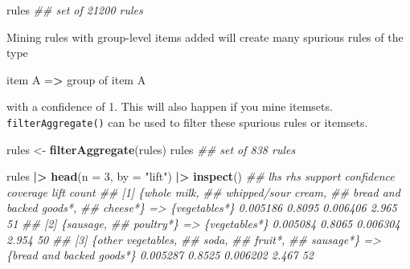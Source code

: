 \documentclass[
  notitlepage]{book}
\newenvironment{Shaded}{\begin{snugshade}}{\end{snugshade}}
\newcommand{\CommentTok}[1]{\textcolor[rgb]{0.56,0.35,0.01}{\textit{#1}}}
\newcommand{\DataTypeTok}[1]{\textcolor[rgb]{0.13,0.29,0.53}{#1}}
\newcommand{\DecValTok}[1]{\textcolor[rgb]{0.00,0.00,0.81}{#1}}
\newcommand{\ErrorTok}[1]{\textcolor[rgb]{0.64,0.00,0.00}{\textbf{#1}}}
\newcommand{\KeywordTok}[1]{\textcolor[rgb]{0.13,0.29,0.53}{\textbf{#1}}}
\newcommand{\NormalTok}[1]{#1}
\newcommand{\OperatorTok}[1]{\textcolor[rgb]{0.81,0.36,0.00}{\textbf{#1}}}
\newcommand{\StringTok}[1]{\textcolor[rgb]{0.31,0.60,0.02}{#1}}
\begin{document}
\begin{Shaded}
\begin{Highlighting}[]
\NormalTok{rules}
\CommentTok{\#\# set of 21200 rules}
\end{Highlighting}
\end{Shaded}

Mining rules with group-level items added will
create many spurious rules of the type

\begin{Shaded}
\begin{Highlighting}[]
\NormalTok{⁠item A =}\ErrorTok{\textgreater{}}\StringTok{ }\NormalTok{group of item A⁠}
\end{Highlighting}
\end{Shaded}

with a confidence of 1.
This will also happen if you mine itemsets. \texttt{filterAggregate()}
can be used to filter these spurious rules or itemsets.

\begin{Shaded}
\begin{Highlighting}[]
\NormalTok{rules \textless{}{-}}\StringTok{ }\KeywordTok{filterAggregate}\NormalTok{(rules)}
\NormalTok{rules}
\CommentTok{\#\# set of 838 rules}
\end{Highlighting}
\end{Shaded}

\begin{Shaded}
\begin{Highlighting}[]
\NormalTok{rules }\OperatorTok{|}\ErrorTok{\textgreater{}}\StringTok{ }\KeywordTok{head}\NormalTok{(}\DataTypeTok{n =} \DecValTok{3}\NormalTok{, }\DataTypeTok{by =} \StringTok{"lift"}\NormalTok{) }\OperatorTok{|}\ErrorTok{\textgreater{}}\StringTok{ }\KeywordTok{inspect}\NormalTok{()}
\CommentTok{\#\#     lhs                           rhs                        support confidence coverage  lift count}
\CommentTok{\#\# [1] \{whole milk,                                                                                    }
\CommentTok{\#\#      whipped/sour cream,                                                                            }
\CommentTok{\#\#      bread and backed goods*,                                                                       }
\CommentTok{\#\#      cheese*\}                  =\textgreater{} \{vegetables*\}             0.005186     0.8095 0.006406 2.965    51}
\CommentTok{\#\# [2] \{sausage,                                                                                       }
\CommentTok{\#\#      poultry*\}                 =\textgreater{} \{vegetables*\}             0.005084     0.8065 0.006304 2.954    50}
\CommentTok{\#\# [3] \{other vegetables,                                                                              }
\CommentTok{\#\#      soda,                                                                                          }
\CommentTok{\#\#      fruit*,                                                                                        }
\CommentTok{\#\#      sausage*\}                 =\textgreater{} \{bread and backed goods*\} 0.005287     0.8525 0.006202 2.467    52}
\end{Highlighting}
\end{Shaded}
\end{document}

